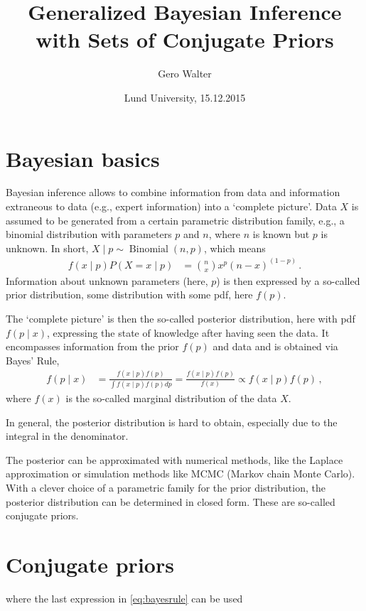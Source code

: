 \documentclass[12pt,a4paper	,twoside]{article}
\title{Generalized Bayesian Inference\\ with Sets of Conjugate Priors}
\author{Gero Walter}
\date{Lund University, 15.12.2015}
\newcommand{\bin}{\operatorname{Binomial}}
\begin{document}
\maketitle

\section{Bayesian basics}

Bayesian inference allows to combine information from data
and information extraneous to data (e.g., expert information)
into a `complete picture'.
Data $X$ is assumed to be generated from a certain parametric distribution family,
e.g., a binomial distribution with parameters $p$ and $n$,
where $n$ is known but $p$ is unknown.
In short, $X\mid p \sim \bin(n,p)$, which means
\begin{align*}
f(x\mid p) P(X = x \mid p) &= {n \choose x} x^p (n-x)^{(1-p)}\,.
\end{align*}
Information about unknown parameters (here, $p$) is then expressed
by a so-called prior distribution, some distribution with some pdf, here $f(p)$.

The `complete picture' is then the so-called posterior distribution,
here with pdf $f(p\mid x)$, expressing the state of knowledge after having seen the data.
It encompasses information from the prior $f(p)$ and data
and is obtained via Bayes' Rule,
\begin{align}
f(p \mid x) &= \frac{f(x\mid p) f(p)}{\int f(x\mid p) f(p) dp}
             = \frac{f(x\mid p) f(p)}{f(x)} \propto f(x\mid p) f(p)\,,
\label{eq:bayesrule}
\end{align}
where $f(x)$ is the so-called marginal distribution of the data $X$.

In general, the posterior distribution is hard to obtain,
especially due to the integral in the denominator.

The posterior can be approximated with numerical methods,
like the Laplace approximation or simulation methods like MCMC (Markov chain Monte Carlo).
With a clever choice of a parametric family for the prior distribution,
the posterior distribution can be determined in closed form.
These are so-called conjugate priors.


\section{Conjugate priors}

where the last expression in \eqref{eq:bayesrule} can be used
\end{document}
